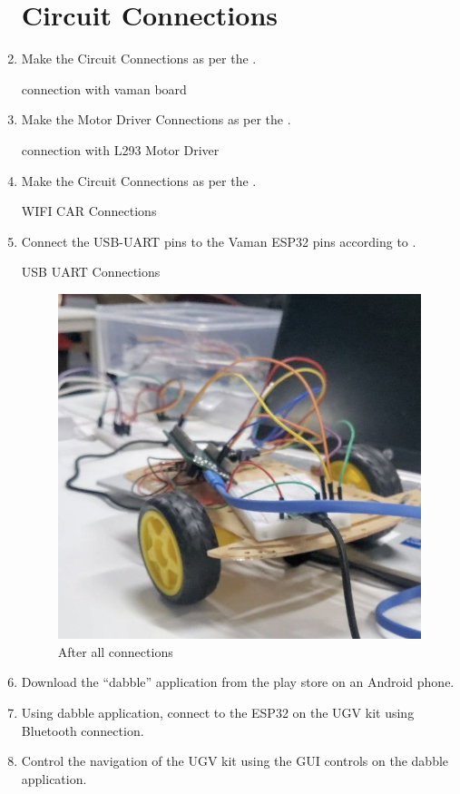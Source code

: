 \begin{enumerate}[label=\thesection.\arabic*.,ref=\thesection.\theenumi]
\section{Circuit Connections}
\item  Make the Circuit Connections as per the  .
\begin{table}[h]
\centering
	
	\caption{connection with vaman board }
	\label{Tab:connections}
\end{table}
\item Make the Motor Driver Connections as per the
.
\begin{table}[h]
\centering
	
	\caption{connection with L293 Motor Driver }
	\label{Tab:connections2}
\end{table}
\item Make the Circuit Connections as per the .
\begin{table}[h]
\centering
	
	\caption{WIFI CAR Connections}
	\label{Tab:connections3}
\end{table}
\item Connect the USB-UART pins to the Vaman ESP32 pins according to .
\begin{table}[h]
\centering
	
	\caption{USB UART Connections}
	\label{Tab:connections4}
\end{table}



\begin{figure}[H]
\centering
\includegraphics[width=0.3\columnwidth]{figs/8.jpg}
\caption{After all connections}
\end{figure}
\item Download the “dabble” application from the play store on an Android phone.
\item Using dabble application, connect to the ESP32 on the UGV kit using Bluetooth connection.
\item Control the navigation of the UGV kit using the GUI controls on the dabble application. 


\end{enumerate}
